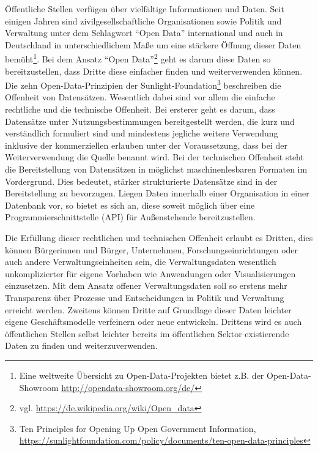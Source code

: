 \documentclass[,a4paper]{article}
\begin{document}
Öffentliche Stellen verfügen über vielfältige Informationen und Daten.
Seit einigen Jahren sind zivilgesellschaftliche Organisationen sowie
Politik und Verwaltung unter dem Schlagwort ``Open Data'' international
und auch in Deutschland in unterschiedlichem Maße um eine stärkere
Öffnung dieser Daten bemüht\footnote{Eine weltweite Übersicht zu
  Open-Data-Projekten bietet z.B. der Open-Data-Showroom
  \url{http://opendata-showroom.org/de/}}. Bei dem Ansatz ``Open
Data''\footnote{vgl. \url{https://de.wikipedia.org/wiki/Open_data}} geht
es darum diese Daten so bereitzustellen, dass Dritte diese einfacher
finden und weiterverwenden können. Die zehn Open-Data-Prinzipien der
Sunlight-Foundation\footnote{Ten Principles for Opening Up Open
  Government Information,
  \url{https://sunlightfoundation.com/policy/documents/ten-open-data-principles}}
beschreiben die Offenheit von Datensätzen. Wesentlich dabei sind vor
allem die einfache rechtliche und die technische Offenheit. Bei ersterer
geht es darum, dass Datensätze unter Nutzungsbestimmungen bereitgestellt
werden, die kurz und verständlich formuliert sind und mindestens
jegliche weitere Verwendung inklusive der kommerziellen erlauben unter
der Voraussetzung, dass bei der Weiterverwendung die Quelle benannt
wird. Bei der technischen Offenheit steht die Bereitstellung von
Datensätzen in möglichst maschinenlesbaren Formaten im Vordergrund. Dies
bedeutet, stärker strukturierte Datensätze sind in der Bereitstellung zu
bevorzugen. Liegen Daten innerhalb einer Organisation in einer Datenbank
vor, so bietet es sich an, diese soweit möglich über eine
Programmierschnittstelle (API) für Außenstehende bereitzustellen.

Die Erfüllung dieser rechtlichen und technischen Offenheit erlaubt es
Dritten, dies können Bürgerinnen und Bürger, Unternehmen,
Forschungseinrichtungen oder auch andere Verwaltungseinheiten sein, die
Verwaltungsdaten wesentlich unkomplizierter für eigene Vorhaben wie
Anwendungen oder Visualisierungen einzusetzen. Mit dem Ansatz offener
Verwaltungsdaten soll so erstens mehr Transparenz über Prozesse und
Entscheidungen in Politik und Verwaltung erreicht werden. Zweitens
können Dritte auf Grundlage dieser Daten leichter eigene
Geschäftsmodelle verfeinern oder neue entwickeln. Drittens wird es auch
öffentlichen Stellen selbst leichter bereits im öffentlichen Sektor
existierende Daten zu finden und weiterzuverwenden.
\end{document}
